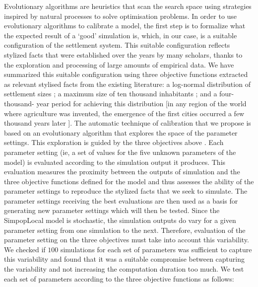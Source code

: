 Evolutionary algorithms are heuristics that scan the search space using strategies inspired by natural processes to solve optimisation problems. In order to use evolutionary algorithms to calibrate a model, the first step is to formalize what the expected result of a ‘good’ simulation is, which, in our case, is a suitable configuration of the settlement system. This suitable configuration reflects stylized facts that were established over the years by many scholars, thanks to the exploration and processing of large amounts of empirical data. We have summarized this suitable configuration using three objective functions extracted as relevant stylised facts from the existing literature: a log-normal distribution of settlement sizes \autocites{Archaeomedes1998,Johnson1977,Liu1996,Sanders2012}; a maximum size of ten thousand inhabitants \autocites{Bairoch1985,Marcus2008}; and a four-thousand- year period for achieving this distribution [in any region of the world where agriculture was invented, the emergence of the first cities occurred a few thousand years later \autocites{Bairoch1985,Marcus2008}]. The automatic technique of calibration that we propose is based on an evolutionary algorithm that explores the space of the parameter settings. This exploration is guided by the three objectives above \autocites{Rey-Coyrehourcq2015,Schmitt2014}. Each parameter setting (ie, a set of values for the five unknown parameters of the model) is evaluated according to the simulation output it produces. This evaluation measures the proximity between the outputs of simulation and the three objective functions defined for the model and thus assesses the ability of the parameter settings to reproduce the stylized facts that we seek to simulate. The parameter settings receiving the best evaluations are then used as a basis for generating new parameter settings which will then be tested. Since the SimpopLocal model is stochastic, the simulation outputs do vary for a given parameter setting from one simulation to the next. Therefore, evaluation of the parameter setting on the three objectives must take into account this variability. We checked if $100$ simulations for each set of parameters was sufficient to capture this variability and found that it was a suitable compromise between capturing the variability and not increasing the computation duration too much. We test each set of parameters according to the three objective functions as follows:

